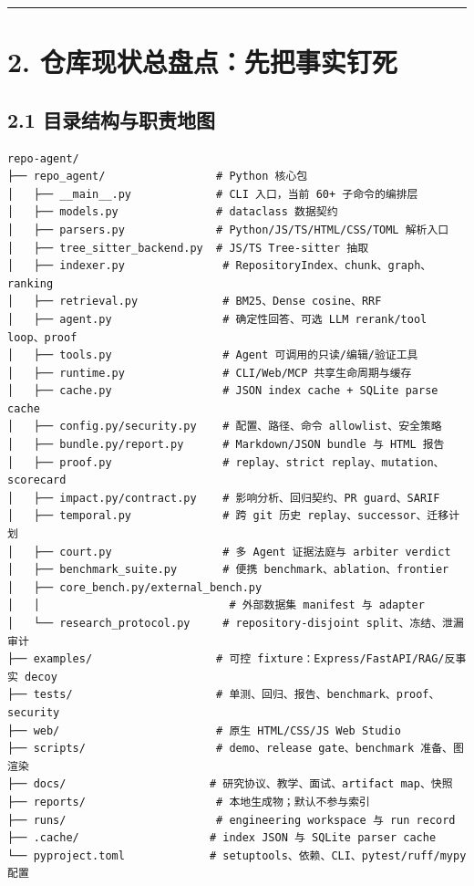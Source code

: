 \documentclass[UTF8,12pt,openany]{ctexbook}
\begin{document}
\hrule

\section{2. 仓库现状总盘点：先把事实钉死}

\subsection{2.1 目录结构与职责地图}

\begin{lstlisting}
repo-agent/
├── repo_agent/                 # Python 核心包
│   ├── __main__.py             # CLI 入口，当前 60+ 子命令的编排层
│   ├── models.py               # dataclass 数据契约
│   ├── parsers.py              # Python/JS/TS/HTML/CSS/TOML 解析入口
│   ├── tree_sitter_backend.py  # JS/TS Tree-sitter 抽取
│   ├── indexer.py               # RepositoryIndex、chunk、graph、ranking
│   ├── retrieval.py             # BM25、Dense cosine、RRF
│   ├── agent.py                 # 确定性回答、可选 LLM rerank/tool loop、proof
│   ├── tools.py                 # Agent 可调用的只读/编辑/验证工具
│   ├── runtime.py               # CLI/Web/MCP 共享生命周期与缓存
│   ├── cache.py                 # JSON index cache + SQLite parse cache
│   ├── config.py/security.py    # 配置、路径、命令 allowlist、安全策略
│   ├── bundle.py/report.py      # Markdown/JSON bundle 与 HTML 报告
│   ├── proof.py                 # replay、strict replay、mutation、scorecard
│   ├── impact.py/contract.py    # 影响分析、回归契约、PR guard、SARIF
│   ├── temporal.py              # 跨 git 历史 replay、successor、迁移计划
│   ├── court.py                 # 多 Agent 证据法庭与 arbiter verdict
│   ├── benchmark_suite.py       # 便携 benchmark、ablation、frontier
│   ├── core_bench.py/external_bench.py
│   │                             # 外部数据集 manifest 与 adapter
│   └── research_protocol.py     # repository-disjoint split、冻结、泄漏审计
├── examples/                   # 可控 fixture：Express/FastAPI/RAG/反事实 decoy
├── tests/                      # 单测、回归、报告、benchmark、proof、security
├── web/                        # 原生 HTML/CSS/JS Web Studio
├── scripts/                    # demo、release gate、benchmark 准备、图渲染
├── docs/                      # 研究协议、教学、面试、artifact map、快照
├── reports/                    # 本地生成物；默认不参与索引
├── runs/                       # engineering workspace 与 run record
├── .cache/                    # index JSON 与 SQLite parser cache
└── pyproject.toml             # setuptools、依赖、CLI、pytest/ruff/mypy 配置
\end{lstlisting}
\end{document}
